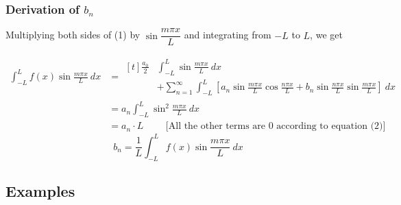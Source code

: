 \documentclass[12pt]{article}
\begin{document}
\subsubsection{Derivation of $b_n$}
Multiplying both sides of (1) by $\sin{\dfrac{m\pi x}{L}}$ and integrating from $-L$ to $L$, we get

\begin{align*}
    \int_{-L}^{L} {f(x) \sin{\frac{m\pi x}{L}}} \: d{x} &=
    \begin{aligned}[t]
        \frac{a_0}{2} &\int_{-L}^{L} {\sin{\frac{m\pi x}{L}}} \: d{x} \\
        & + \sum_{n=1}^{\infty} \int_{-L}^{L} \left[ a_n \sin{\frac{m\pi x}{L}} \cos{\frac{n\pi x}{L}} + b_n \sin{\frac{n\pi x}{L}} \sin{\frac{m\pi x}{L}} \right] \: d{x}
    \end{aligned} \\
    &= a_n \int_{-L}^{L} {\sin^2{\frac{m\pi x}{L}}} \: d{x} \\
    &= a_n \cdot L \qquad \text{ [All the other terms are $0$ according to equation (2)] }
\end{align*}
\[ \boxed{ b_n = \frac{1}{L} \int_{-L}^{L} {f(x) \sin{\frac{m\pi x}{L}}} \: d{x} } \]


\subsection{Examples}
\end{document}
